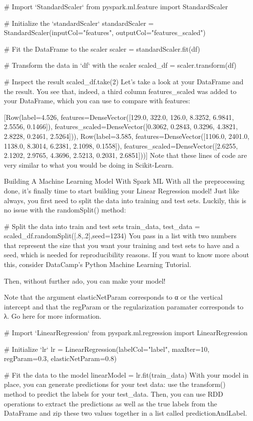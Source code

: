 \documentclass[a4paper,12pt]{article}
\begin{document}
# Import `StandardScaler` 
from pyspark.ml.feature import StandardScaler

# Initialize the `standardScaler`
standardScaler = StandardScaler(inputCol="features", outputCol="features_scaled")

# Fit the DataFrame to the scaler
scaler = standardScaler.fit(df)

# Transform the data in `df` with the scaler
scaled_df = scaler.transform(df)

# Inspect the result
scaled_df.take(2)
Let’s take a look at your DataFrame and the result. You see that, indeed, a third column features_scaled was added to your DataFrame, which you can use to compare with features:

[Row(label=4.526, features=DenseVector([129.0, 322.0, 126.0, 8.3252, 6.9841, 2.5556, 0.1466]), features_scaled=DenseVector([0.3062, 0.2843, 0.3296, 4.3821, 2.8228, 0.2461, 2.5264])), Row(label=3.585, features=DenseVector([1106.0, 2401.0, 1138.0, 8.3014, 6.2381, 2.1098, 0.1558]), features_scaled=DenseVector([2.6255, 2.1202, 2.9765, 4.3696, 2.5213, 0.2031, 2.6851]))]
Note that these lines of code are very similar to what you would be doing in Scikit-Learn.

Building A Machine Learning Model With Spark ML
With all the preprocessing done, it’s finally time to start building your Linear Regression model! Just like always, you first need to split the data into training and test sets. Luckily, this is no issue with the randomSplit() method:

# Split the data into train and test sets
train_data, test_data = scaled_df.randomSplit([.8,.2],seed=1234)
You pass in a list with two numbers that represent the size that you want your training and test sets to have and a seed, which is needed for reproducibility reasons. If you want to know more about this, consider DataCamp’s Python Machine Learning Tutorial.

Then, without further ado, you can make your model!

Note that the argument elasticNetParam corresponds to α or the vertical intercept and that the regParam or the regularization paramater corresponds to λ. Go here for more information.

# Import `LinearRegression`
from pyspark.ml.regression import LinearRegression

# Initialize `lr`
lr = LinearRegression(labelCol="label", maxIter=10, regParam=0.3, elasticNetParam=0.8)

# Fit the data to the model
linearModel = lr.fit(train_data)
With your model in place, you can generate predictions for your test data: use the transform() method to predict the labels for your test_data. Then, you can use RDD operations to extract the predictions as well as the true labels from the DataFrame and zip these two values together in a list called predictionAndLabel.
\end{document}
